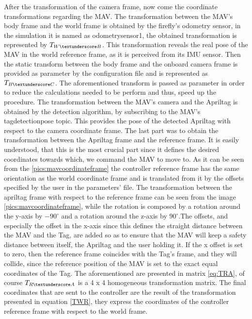 After the transformation of the camera frame, now come the coordinate transformations regarding the MAV. The transformation between the MAV's body frame and the world frame is obtained by the firefly's odometry sensor, in the simulation it is named as odometry\textunderscore sensor1, the obtained transformation is represented by $T_{W\textunderscore B}$. This transformation reveals the real pose of the MAV in the world reference frame, as it is perceived from its IMU sensor. Then the static transform between the body frame and the onboard camera frame is provided as parameter by the configuration file and is represented as $T_{B\textunderscore C}$. The aforementioned transform is passed as parameter in order to reduce the calculations needed to be perform and thus, speed up the procedure. The transformation between the MAV's camera and the Apriltag is obtained by the detection algorithm, by subscribing to the MAV's  tag\textunderscore detection\textunderscore pose topic. This provides the pose of the detected Apriltag with respect to the camera coordinate frame. The last part was to obtain the transformation between the Apriltag frame and the reference frame. It is  easily understood, that this is the most crucial part since it defines the desired coordinates towards which, we command the MAV to move to. As it can be seen from the \ref{pics:mavcoordinateframe} the controller reference frame has the same orientation as the world coordinate frame and is translated from it by the offsets specified by the user in the parameters' file. The transformation between the apriltag frame with respect to the reference frame can be seen from the image \ref{pics:mavcoordinateframe}, while the rotation is composed by a rotation around the y-axis by $-90^{\circ}$ and a rotation around the z-axis by $90^{\circ}$.The offsets, and especially the offset in the x-axis since this defines the straight distance between the MAV and the Tag, are added so as to ensure that the MAV will keep a safety distance between itself, the Apriltag and the user holding it. If the x offset is set to zero, then the reference frame coincides with the Tag's frame, and they will collide, since the reference position of the MAV is set to the exact equal coordinates of the Tag. The aforementioned are presented in matrix \ref{eq:TRA}, of course $T_{R\textunderscore A}$ is a 4 x 4 homogeneous transformation matrix. The final coordinates that are sent to the controller are the result of the transformation presented in equation \ref{TWR}, they express the coordinates of the controller reference frame with respect to the world frame.
 

